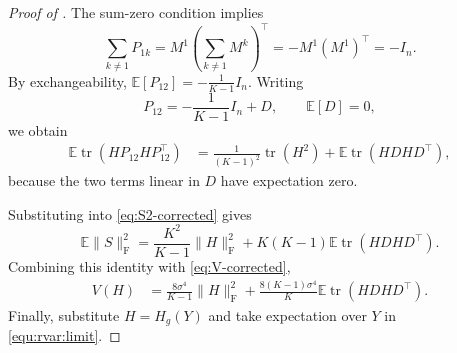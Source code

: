 \documentclass[10pt,a4paper]{amsart}
\newcommand{\tran}{^\intercal}
\begin{document}
\begin{proof}[Proof of ]
The sum-zero condition implies
\[
\sum_{k\neq1}P_{1k}
=
M^1\left(\sum_{k\neq1}M^k\right)\tran
=
-M^1(M^1)\tran
=
-I_n.
\]
By exchangeability,
$\mathbb E[P_{12}]=-\frac1{K-1}I_n$.
Writing
\[
P_{12}
=
-\frac1{K-1}I_n+D,
\qquad
\mathbb E[D]=0,
\]
we obtain
\begin{align*}
\mathbb E\operatorname{tr}
\left(
H P_{12}H P_{12}\tran
\right)
&=
\frac1{(K-1)^2}\operatorname{tr}(H^2)
+
\mathbb E\operatorname{tr}
\left(
H D H D\tran
\right),
\end{align*}
because the two terms linear in $D$ have expectation zero.

Substituting into \eqref{eq:S2-corrected} gives
\[
\mathbb E\|S\|_{\mathrm F}^2
=
\frac{K^2}{K-1}\|H\|_{\mathrm F}^2
+
K(K-1)
\mathbb E\operatorname{tr}
\left(
H D H D\tran
\right).
\]
Combining this identity with \eqref{eq:V-corrected},
\begin{align*}
V(H)
&=
\frac{8\sigma^4}{K-1}\|H\|_{\mathrm F}^2+
\frac{8(K-1)\sigma^4}{K}
\mathbb E\operatorname{tr}
\left(
H D H D\tran
\right).
\end{align*}
Finally, substitute $H=H_g(Y)$ and take expectation over $Y$ in
\eqref{equ:rvar:limit}.
\end{proof}
\end{document}
